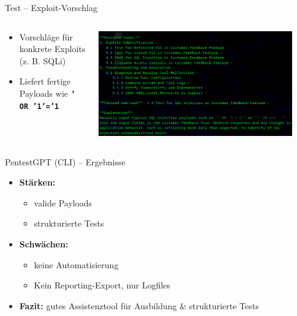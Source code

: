 \documentclass[
	aspectratio=169,	%
	onlytextwidth,		%
	t,					%
	]{beamer}
\begin{document}
\begin{frame}{Test – Exploit-Vorschlag}
	\begin{columns}
		\begin{column}[T]{.4\textwidth}
			\begin{itemize}
				\item Vorschläge für konkrete Exploits (z. B. SQLi)
				\item Liefert fertige Payloads wie \textbf{\texttt{' OR '1'='1}}
			\end{itemize}
		\end{column}
		\begin{column}[T]{.6\textwidth}
			\centering
			
			\includegraphics[width=0.9\textwidth]{figures/13.png}
			\label{fig:13}
		\end{column}
	\end{columns}
\end{frame}


\begin{frame}{PentestGPT (CLI) – Ergebnisse}
	\begin{itemize}
		\item \textbf{Stärken:}
		\begin{itemize}
			\item valide Payloads
			\item strukturierte Tests
		\end{itemize}
		\vspace{2mm}
		\item \textbf{Schwächen:}
		\begin{itemize}
			\item keine Automatisierung
			\item Kein Reporting-Export, nur Logfiles
		\end{itemize}
		\vspace{2mm}
		\item \textbf{Fazit:}  
		gutes Assistenztool für Ausbildung \& strukturierte Tests
	\end{itemize}
\end{frame}
\end{document}
